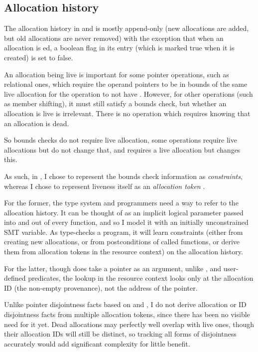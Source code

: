 \subsection{Allocation history}\label{subsec:alloc-history}

The allocation history in  and  is mostly append-only
(new allocations are added, but old allocations are never removed) with the
exception that when an allocation is ed, a boolean flag in its
entry (which is marked true when it is created) is set to false.

An allocation being live is important for some pointer operations, such as
relational ones, which require the operand pointers to be in bounds of the same
live allocation for the operation to not have . However, for other
operations (such as member shifting), it must still satisfy a bounds check, but
whether an allocation is live is irrelevant. There is no operation which
requires knowing that an allocation is dead.

So bounds checks do not require live allocation, some operations require
live allocations but do not change that, and  requires
a live allocation but changes this.

As such, in , I chose to represent the bounds check information as
\emph{constraints}, whereas I chose to represent liveness itself as an
\emph{allocation token} .

For the former, the type system and programmers need a way to refer to the
allocation history. It can be thought of as an implicit logical parameter
passed into and out of every function, and so I model it with an initially
unconstrained SMT variable. As  type-checks a  program, it
will learn constraints (either from creating new allocations, or from
postconditions of called functions, or derive them from allocation tokens in
the resource context) on the allocation history.

For the latter, though  does take a pointer as an argument,
unlike ,  and user-defined predicates, the
lookup in the resource context looks only at the allocation ID (the non-empty
provenance), not the address of the pointer.

Unlike pointer disjointness facts based on  and
, I do not derive allocation or ID disjointness facts from
multiple allocation tokens, since there has been no visible need for it
yet.\label{sn:ptr-eq-annotation} Dead allocations may perfectly well overlap
with live ones, though their allocation IDs will still be distinct, so tracking
all forms of disjointness accurately would add significant complexity for
little benefit.

